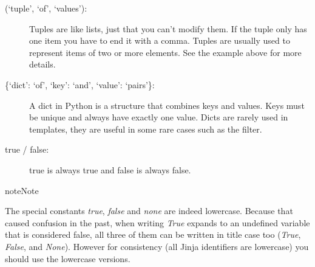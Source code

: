 \documentclass[a4paper,10pt,english]{sphinxmanual}
\begin{document}
\begin{description}
\item[{(`tuple', `of', `values'):}] \leavevmode
Tuples are like lists, just that you can't modify them.  If the tuple
only has one item you have to end it with a comma.  Tuples are usually
used to represent items of two or more elements.  See the example above
for more details.

\item[{\{`dict': `of', `key': `and', `value': `pairs'\}:}] \leavevmode
A dict in Python is a structure that combines keys and values.  Keys must
be unique and always have exactly one value.  Dicts are rarely used in
templates, they are useful in some rare cases such as the {\hyperref[templates:xmlattr]{}}
filter.

\item[{true / false:}] \leavevmode
true is always true and false is always false.

\end{description}

\begin{notice}{note}{Note}

The special constants \emph{true}, \emph{false} and \emph{none} are indeed lowercase.
Because that caused confusion in the past, when writing \emph{True} expands
to an undefined variable that is considered false, all three of them can
be written in title case too (\emph{True}, \emph{False}, and \emph{None}).  However for
consistency (all Jinja identifiers are lowercase) you should use the
lowercase versions.
\end{notice}
\end{document}
